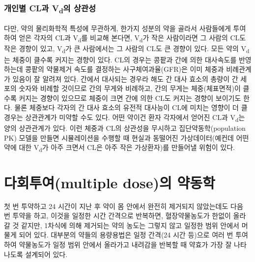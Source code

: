 \documentclass[
  11pt,
  krantz2, a4paper, twoside]{krantz}
\theoremstyle{definition}
\theoremstyle{definition}
\theoremstyle{definition}
\theoremstyle{definition}
\theoremstyle{remark}
\begin{document}
\hypertarget{uxac1cuxc778uxbcc4-cluxacfc-vduxc758-uxc0c1uxad00uxc131}{%
\subsubsection{\texorpdfstring{개인별 CL과 V\textsubscript{d}의 상관성}{개인별 CL과 Vd의 상관성}}\label{uxac1cuxc778uxbcc4-cluxacfc-vduxc758-uxc0c1uxad00uxc131}}

다만, 약의 물리화학적 특성에 무관하게, 한가지 성분의 약을 골라서 사람들에게 투여하여 얻은 각자의 CL과 V\textsubscript{d}를 비교해 본다면, V\textsubscript{d}가 작은 사람이라면 그 사람의 CL도 작은 경향이 있고, V\textsubscript{d}가 큰 사람에서는 그 사람의 CL도 큰 경향이 있다.
모든 약의 V\textsubscript{d}는 체중이 클수록 커지는 경향이 있다. 
CL의 경우는 콩팥과 간에 의한 대사속도를 반영하는데 콩팥의 약물제거 속도를 결정하는 사구체여과율(GFR)은 이미 체중과 비례관계가 있음이 잘 알려져 있다. 
간에서 대사되는 경우라 해도 간 대사 효소의 총량이 간 세포의 숫자와 비례할 것이므로 간의 무게와 비례하고, 간의 무게는 체중(체표면적)이 클수록 커지는 경향이 있으므로 체중이 크면 간에 의한 CL도 커지는 경향이 보이기도 한다. 
물론 체중보다 각자의 간 대사 효소의 유전적 대사능이 CL에 미치는 영향이 더 클 경우는 상관관계가 미약할 수도 있다. 
어떤 약이건 환자 각자에서 얻어진 CL과 V\textsubscript{d}는 양의 상관관계가 있다.
이런 체중과 CL의 상관성을 무시하고 집단약동학(population PK) 모델을 만들면 시뮬레이션을 수행할 때 현실과 동떨어진 가상데이터(예컨데 어떤 약에 대한 V\textsubscript{d}가 아주 크면서 CL은 아주 작은 가상환자)를 만들어낼 위험이 있다.

\hypertarget{uxb2e4uxd68cuxd22cuxc5ecmultiple-doseuxc758-uxc57duxb3d9uxd559}{%
\section{\texorpdfstring{다회투여(multiple dose)의 약동학}{다회투여(multiple dose)의 약동학}}\label{uxb2e4uxd68cuxd22cuxc5ecmultiple-doseuxc758-uxc57duxb3d9uxd559}}

첫 번 투약하고 24 시간이 지난 후 약이 몸 안에서 완전히 제거되지 않았는데도 다음 번 투약을 하고, 이것을 일정한 시간 간격으로 반복하면, 혈장약물농도가 한없이 올라갈 것 같지만, 1차식에 의해 제거되는 약의 농도는 그렇지 않고 일정한 범위 안에서 머물게 되어 있다.
대부분의 약들의 용량용법은 일정 간격(24 시간 등)으로 여러 번 투여하여 약물농도가 일정 범위 안에서 올라가고 내려감을 반복할 때 약효가 가장 잘 나타나도록 설계되어 있다.
\end{document}
